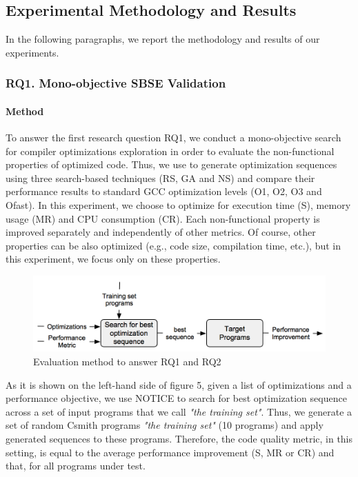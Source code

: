 \subsection{Experimental Methodology and Results}
In the following paragraphs, we report the methodology and results of our experiments.

\subsubsection{RQ1. Mono-objective SBSE Validation}
\paragraph{Method}

To answer the first research question RQ1, we conduct a mono-objective search for compiler optimizations exploration in order to evaluate the non-functional properties of optimized code. Thus, we use to generate optimization sequences using three search-based techniques (RS, GA and NS) and compare their performance results to standard GCC optimization levels (O1, O2, O3 and Ofast). 
In this experiment, we choose to optimize for execution time (S), memory usage (MR) and CPU consumption (CR). Each non-functional property is improved separately and independently of other metrics. Of course, other properties can be also optimized (e.g., code size, compilation time, etc.), but in this experiment, we focus only on these properties.

\begin{figure}[h]
	\centering
	\includegraphics[width=1.\linewidth]{Ressources/sensitivity.png}
	\caption{Evaluation method to answer RQ1 and RQ2}
\end{figure}
As it is shown on the left-hand side of figure 5, given a list of optimizations and a performance objective, we use NOTICE to search for best optimization sequence across a set of input programs that we call \textit{"the training set"}. Thus, we generate a set of random Csmith programs \textit{"the training set"} (10 programs) and apply generated sequences to these programs. Therefore, the code quality metric, in this setting, is equal to the average performance improvement (S, MR or CR) and that, for all programs under test. 

